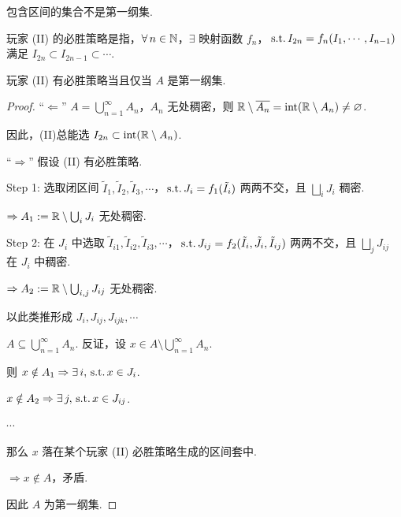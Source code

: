 \begin{corollary}
    包含区间的集合不是第一纲集.
\end{corollary}

玩家 (II) 的必胜策略是指，$\forall\, n \in \mathbb{N}$，$\exists$ 映射函数 $f_n$，$\operatorname{\,\text{s.t.}} I_{2n} = f_n(I_1, \cdots, I_{n-1})$ 满足 $I_{2n} \subset I_{2n-1} \subset \cdots$.


\begin{theorem}
    玩家 (II) 有必胜策略当且仅当 $A$ 是第一纲集.
\end{theorem}

\begin{proof}
    “$\Longleftarrow$” $A = \bigcup_{n=1}^\infty A_n$，$A_n$ 无处稠密，则 $\mathbb{R}\setminus\overline{A_n}=\mathrm{int}(\mathbb{R} \setminus A_n) \neq \varnothing$.\par
    因此，(II)总能选 $I_{2n} \subset \mathrm{int}(\mathbb{R} \setminus A_n)$.\par
    “$\Longrightarrow$” 假设 (II) 有必胜策略.\par
    Step 1: 选取闭区间 $\tilde{I}_1, \tilde{I}_2, \tilde{I}_3, \cdots$，$\operatorname{\,\text{s.t.}} J_i = f_1(\tilde{I}_i)$ 两两不交，且 $\bigsqcup_i J_i$ 稠密.\par
    $\Rightarrow A_1 := \mathbb{R} \setminus \bigcup_i J_i$ 无处稠密.\par
    Step 2: 在 $J_i$ 中选取 $\tilde{I}_{i1}, \tilde{I}_{i2}, \tilde{I}_{i3}, \cdots$，$\operatorname{\,\text{s.t.}} J_{ij} = f_2(\tilde{I}_i, \tilde{J}_i, \tilde{I}_{ij})$ 两两不交，且 $\bigsqcup_j J_{ij}$ 在 $J_i$ 中稠密.\par
    $\Rightarrow A_2 := \mathbb{R} \setminus \bigcup_{i,j} J_{ij}$ 无处稠密.\par
    以此类推形成 $J_i, J_{ij}, J_{ijk}, \cdots $\par
    \begin{claim}{$A \subseteq \bigcup_{n=1}^\infty A_n$.}
    反证，设 $x \in A \setminus \bigcup_{n=1}^\infty A_n$.\par
    则 $x \notin A_1 \Rightarrow \exists\, i, \operatorname{\,\text{s.t.}} x \in J_i$.\par
    $x \notin A_2 \Rightarrow \exists\, j, \operatorname{\,\text{s.t.}} x \in J_{ij}$.\par
    $\cdots$\par
    那么 $x$ 落在某个玩家 (II) 必胜策略生成的区间套中.\par
    $\Rightarrow x \notin A$，矛盾.
    \end{claim}

    因此 $A$ 为第一纲集.
\end{proof}


